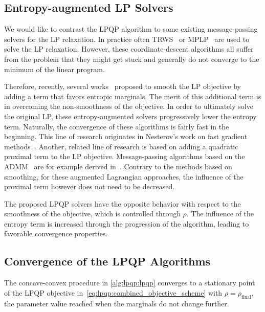 \subsection{Entropy-augmented LP Solvers}

We would like to contrast the \ac{LPQP} algorithm to some
existing message-passing solvers for the \ac{LP} relaxation. In practice often
\ac{TRWS}~\parencite{Kolmogorov2006} or
\ac{MPLP}~\parencite{Sontag2008} are used to solve the \ac{LP} relaxation. However, these
coordinate-descent algorithms all suffer from the problem that they might
get stuck and generally do not converge to the minimum of the linear program.

Therefore, recently, several works~\parencite{Jojic2010,Savchynskyy2011} proposed to smooth
the \ac{LP} objective by adding a term that favors entropic marginals. The merit of this 
additional term is in overcoming the non-smoothness of the objective. 
In order to ultimately solve the original \ac{LP}, these entropy-augmented 
solvers progressively lower the entropy term. Naturally, the convergence of these
algorithms is fairly fast in the beginning. This line of research originates in Nesterov's 
work on fast gradient methods~\parencite{Nesterov1983,Nesterov2005}.
Another, related line
of research is based on adding a quadratic proximal term to the \ac{LP}
objective. Message-passing algorithms based on the \ac{ADMM}~\parencite{Boyd2011} are for
example derived in~\parencite{Martins2011,Meshi2011}. Contrary to the
methods based on smoothing, for these augmented Lagrangian approaches, the influence of
the proximal term however does not need to be decreased.

The proposed \ac{LPQP} solvers have the opposite behavior with respect to 
the smoothness of the objective, which is controlled through $\rho$. The influence of the entropy term is increased 
through the progression of the algorithm, leading to favorable convergence properties.

\subsection{Convergence of the LPQP Algorithms}

\begin{lemma} 
\label{prop:lpqp:convergence}
The concave-convex procedure in \autoref{alg:lpqp:lpqp} converges to 
a stationary point of the \ac{LPQP} objective in~\eqref{eq:lpqp:combined_objective_scheme} 
with $\rho=\rho_{\text{final}}$, the parameter value reached when the marginals do not 
change further.
\end{lemma}

